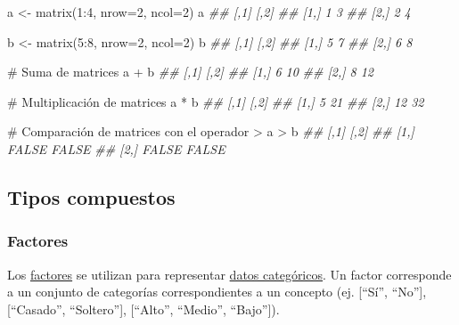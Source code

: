 \documentclass[
  letterpaper,
  DIV=11,
  numbers=noendperiod]{scrreprt}
\newenvironment{Shaded}{\begin{snugshade}}{\end{snugshade}}
\newcommand{\AttributeTok}[1]{\textcolor[rgb]{0.40,0.45,0.13}{#1}}
\newcommand{\CommentTok}[1]{\textcolor[rgb]{0.37,0.37,0.37}{#1}}
\newcommand{\DecValTok}[1]{\textcolor[rgb]{0.68,0.00,0.00}{#1}}
\newcommand{\DocumentationTok}[1]{\textcolor[rgb]{0.37,0.37,0.37}{\textit{#1}}}
\newcommand{\FunctionTok}[1]{\textcolor[rgb]{0.28,0.35,0.67}{#1}}
\newcommand{\NormalTok}[1]{\textcolor[rgb]{0.00,0.23,0.31}{#1}}
\newcommand{\OtherTok}[1]{\textcolor[rgb]{0.00,0.23,0.31}{#1}}
\newcommand{\SpecialCharTok}[1]{\textcolor[rgb]{0.37,0.37,0.37}{#1}}
\begin{document}
\begin{Shaded}
\begin{Highlighting}[]
\NormalTok{a }\OtherTok{\textless{}{-}} \FunctionTok{matrix}\NormalTok{(}\DecValTok{1}\SpecialCharTok{:}\DecValTok{4}\NormalTok{, }\AttributeTok{nrow=}\DecValTok{2}\NormalTok{, }\AttributeTok{ncol=}\DecValTok{2}\NormalTok{)}
\NormalTok{a}
\DocumentationTok{\#\#      [,1] [,2]}
\DocumentationTok{\#\# [1,]    1    3}
\DocumentationTok{\#\# [2,]    2    4}

\NormalTok{b }\OtherTok{\textless{}{-}} \FunctionTok{matrix}\NormalTok{(}\DecValTok{5}\SpecialCharTok{:}\DecValTok{8}\NormalTok{, }\AttributeTok{nrow=}\DecValTok{2}\NormalTok{, }\AttributeTok{ncol=}\DecValTok{2}\NormalTok{)}
\NormalTok{b}
\DocumentationTok{\#\#      [,1] [,2]}
\DocumentationTok{\#\# [1,]    5    7}
\DocumentationTok{\#\# [2,]    6    8}

\CommentTok{\# Suma de matrices}
\NormalTok{a }\SpecialCharTok{+}\NormalTok{ b}
\DocumentationTok{\#\#      [,1] [,2]}
\DocumentationTok{\#\# [1,]    6   10}
\DocumentationTok{\#\# [2,]    8   12}

\CommentTok{\# Multiplicación de matrices}
\NormalTok{a }\SpecialCharTok{*}\NormalTok{ b}
\DocumentationTok{\#\#      [,1] [,2]}
\DocumentationTok{\#\# [1,]    5   21}
\DocumentationTok{\#\# [2,]   12   32}

\CommentTok{\# Comparación de matrices con el operador \textgreater{}}
\NormalTok{a }\SpecialCharTok{\textgreater{}}\NormalTok{ b}
\DocumentationTok{\#\#       [,1]  [,2]}
\DocumentationTok{\#\# [1,] FALSE FALSE}
\DocumentationTok{\#\# [2,] FALSE FALSE}
\end{Highlighting}
\end{Shaded}

\hypertarget{tipos-compuestos}{%
\subsection{Tipos compuestos}\label{tipos-compuestos}}

\hypertarget{factores}{%
\subsubsection{Factores}\label{factores}}

Los
\href{https://cran.r-project.org/doc/manuals/r-release/R-lang.html\#Factors}{factores}
se utilizan para representar
\href{https://es.wikipedia.org/wiki/Variable_categ\%C3\%B3rica}{datos
categóricos}. Un factor corresponde a un conjunto de categorías
correspondientes a un concepto (ej. {[}``Sí'', ``No''{]}, {[}``Casado'',
``Soltero''{]}, {[}``Alto'', ``Medio'', ``Bajo''{]}).
\end{document}
